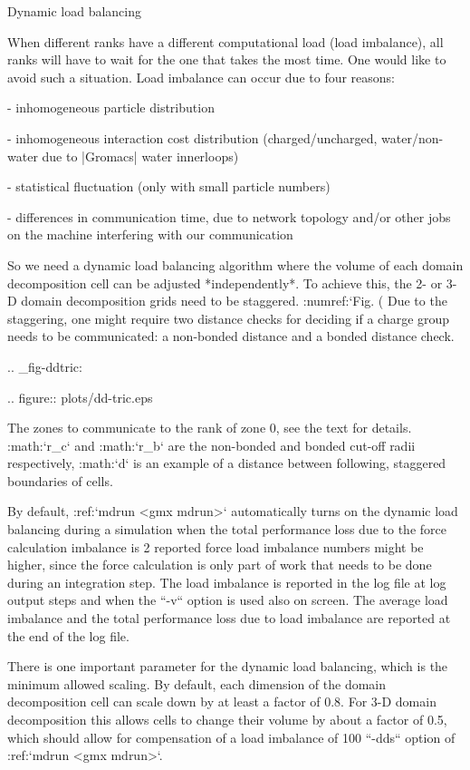 {Dynamic load balancing
~~~~~~~~~~~~~~~~~~~~~~

When different ranks have a different computational load (load
imbalance), all ranks will have to wait for the one that takes the most
time. One would like to avoid such a situation. Load imbalance can occur
due to four reasons:

-  inhomogeneous particle distribution

-  inhomogeneous interaction cost distribution (charged/uncharged,
   water/non-water due to |Gromacs| water innerloops)

-  statistical fluctuation (only with small particle numbers)

-  differences in communication time, due to network topology and/or
   other jobs on the machine interfering with our communication

So we need a dynamic load balancing algorithm where the volume of each
domain decomposition cell can be adjusted *independently*. To achieve
this, the 2- or 3-D domain decomposition grids need to be staggered.
:numref:`Fig. (%
Due to the staggering, one might require two distance checks for
deciding if a charge group needs to be communicated: a non-bonded
distance and a bonded distance check.

.. _fig-ddtric:

.. figure:: plots/dd-tric.eps

   The zones to communicate to the rank of zone 0, see the text
   for details. :math:`r_c` and :math:`r_b` are the non-bonded and
   bonded cut-off radii respectively, :math:`d` is an example of a
   distance between following, staggered boundaries of cells.

By default, :ref:`mdrun <gmx mdrun>` automatically turns on the dynamic
load balancing during a simulation when the total performance loss due
to the force calculation imbalance is 2%
reported force load imbalance numbers might be higher, since the force
calculation is only part of work that needs to be done during an
integration step. The load imbalance is reported in the log file at log
output steps and when the ``-v`` option is used also on
screen. The average load imbalance and the total performance loss due to
load imbalance are reported at the end of the log file.

There is one important parameter for the dynamic load balancing, which
is the minimum allowed scaling. By default, each dimension of the domain
decomposition cell can scale down by at least a factor of 0.8. For 3-D
domain decomposition this allows cells to change their volume by about a
factor of 0.5, which should allow for compensation of a load imbalance
of 100%
``-dds`` option of :ref:`mdrun <gmx mdrun>`.

}
